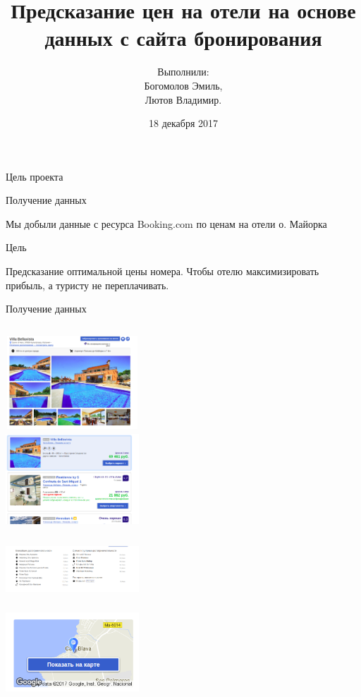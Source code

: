 \documentclass[14pt,mathserif,aspectratio=43]{beamer}
\title{Предсказание цен на отели на основе данных с сайта бронирования\vspace{-1em}}
\author{Выполнили:\\Богомолов Эмиль, \\ Лютов Владимир.}
\date{\small{18 декабря 2017}}
\begin{document}
\begin{frame}[plain]
    \titlepage
 \end{frame}

\begin{frame}[label=target]{Цель проекта}

    \textcolor{lab-blue}{Получение данных}

    Мы добыли данные с ресурса Booking.com по ценам на отели о. Майорка

    \textcolor{lab-blue}{Цель}
    
    Предсказание оптимальной цены номера. Чтобы отелю максимизировать прибыль, а туристу не переплачивать.
    
    \hyperlink{sad}{}
    
\end{frame}

\begin{frame}{Получение данных}

    \begin{columns}[t]
    \centering
    \includegraphics[width=5cm,height=3.5cm]{villa.png}\\
    \includegraphics[width=5cm,height=3.5cm]{prices.png}\\
    \centering
    \includegraphics[width=5cm,height=3cm]{sights.png}\\
    \includegraphics[width=5cm,height=3cm]{map.png}
\end{columns}

\end{frame}
\end{document}
